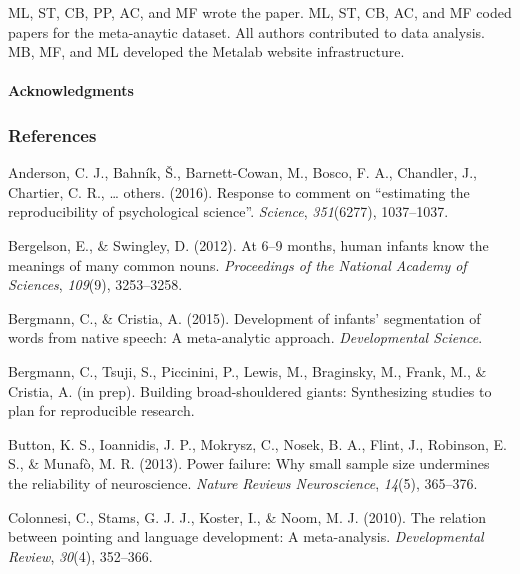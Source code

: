 \documentclass[english,floatsintext,man]{apa6}
\newcounter{author}
\begin{document}
ML, ST, CB, PP, AC, and MF wrote the paper. ML, ST, CB, AC, and MF coded
papers for the meta-anaytic dataset. All authors contributed to data
analysis. MB, MF, and ML developed the Metalab website infrastructure.

\paragraph{Acknowledgments}\label{acknowledgments}

\newpage

\subsubsection{References}\label{references}

\setlength{\parindent}{-0.5in} \setlength{\leftskip}{0.5in}
\setlength{\parskip}{8pt}

\hypertarget{refs}{}
\hypertarget{ref-anderson2016response}{}
Anderson, C. J., Bahník, Š., Barnett-Cowan, M., Bosco, F. A., Chandler,
J., Chartier, C. R., \ldots{} others. (2016). Response to comment on
``estimating the reproducibility of psychological science''.
\emph{Science}, \emph{351}(6277), 1037--1037.

\hypertarget{ref-bergelson2016}{}
Bergelson, E., \& Swingley, D. (2012). At 6--9 months, human infants
know the meanings of many common nouns. \emph{Proceedings of the
National Academy of Sciences}, \emph{109}(9), 3253--3258.

\hypertarget{ref-bergmann2015development}{}
Bergmann, C., \& Cristia, A. (2015). Development of infants'
segmentation of words from native speech: A meta-analytic approach.
\emph{Developmental Science}.

\hypertarget{ref-bergmanneducational}{}
Bergmann, C., Tsuji, S., Piccinini, P., Lewis, M., Braginsky, M., Frank,
M., \& Cristia, A. (in prep). Building broad-shouldered giants:
Synthesizing studies to plan for reproducible research.

\hypertarget{ref-button2013power}{}
Button, K. S., Ioannidis, J. P., Mokrysz, C., Nosek, B. A., Flint, J.,
Robinson, E. S., \& Munafò, M. R. (2013). Power failure: Why small
sample size undermines the reliability of neuroscience. \emph{Nature
Reviews Neuroscience}, \emph{14}(5), 365--376.

\hypertarget{ref-colonnesi2010relation}{}
Colonnesi, C., Stams, G. J. J., Koster, I., \& Noom, M. J. (2010). The
relation between pointing and language development: A meta-analysis.
\emph{Developmental Review}, \emph{30}(4), 352--366.
\end{document}
